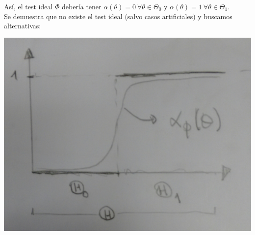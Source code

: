 \documentclass[10pt]{article}
\theoremstyle{plain}
\theoremstyle{definition}
\begin{document}
 Así, el test ideal $\Phi$ debería tener $\alpha(\theta)= 0\ \forall \theta \in \Theta_{0}$ y $\alpha(\theta)=1\ \forall \theta \in \Theta_{1}$.\\
 Se demuestra que no existe el test ideal (salvo casos artificiales) y buscamos alternativas:
 \begin{center}
 \includegraphics[scale=0.2]{imagenes/test1.jpg}
 \end{center}
\end{document}
